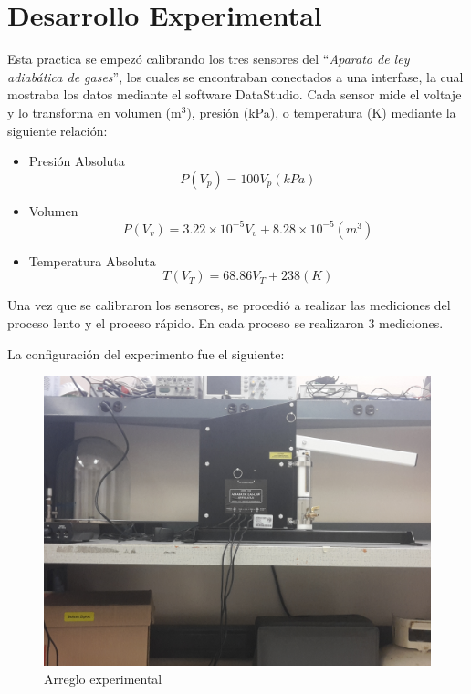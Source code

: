 \documentclass[12pt]{article}
\begin{document}
\section{Desarrollo Experimental}
\vspace{-0.5cm}
Esta practica se empezó calibrando los tres sensores del ``\textit{Aparato de ley adiabática de gases}'', los cuales se encontraban conectados a una interfase, la cual mostraba los datos mediante el software DataStudio. Cada sensor mide el voltaje y lo transforma en volumen (m$^3$), presión (kPa), o temperatura (K) mediante la siguiente relación:
\begin{itemize}
\item Presión Absoluta 
$$ P(V_p) = 100V_p (kPa) $$
\item Volumen
$$ P(V_v) = 3.22\times 10^{-5}V_v +8.28 \times 10^{-5} (m^3) $$
\item Temperatura Absoluta
$$ T(V_T) = 68.86V_T +238 (K) $$
\end{itemize} 
 Una vez que se calibraron los sensores, se procedió a realizar las mediciones del proceso lento y el proceso rápido. En cada proceso se realizaron 3 mediciones. 
 
La configuración del experimento fue el siguiente:
 \begin{figure}[H]
 \centering
 \includegraphics[width= 0.35\linewidth]{config.jpg}
 \caption{Arreglo experimental}
 \end{figure}
\pagebreak
\end{document}

